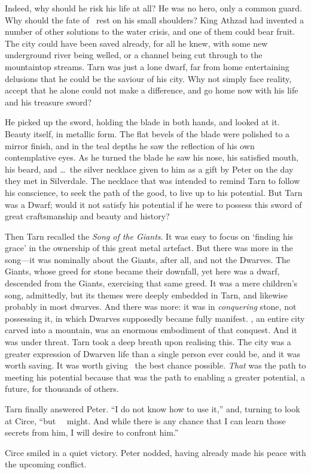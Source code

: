 Indeed, why should he risk his life at all?  He was no hero, only a common guard.  Why should the fate of \korbarthrond\ rest on his small shoulders?  King Athzad had invented a number of other solutions to the water crisis, and one of them could bear fruit.  The city could have been saved already, for all he knew, with some new underground river being welled, or a channel being cut through to the mountaintop streams.  Tarn was just a lone dwarf, far from home entertaining delusions that he could be the saviour of his city.  Why not simply face reality, accept that he alone could not make a difference, and go home now with his life and his treasure sword?

He picked up the sword, holding the blade in both hands, and looked at it.  Beauty itself, in metallic form.  The flat bevels of the blade were polished to a mirror finish, and in the teal depths he saw the reflection of his own contemplative eyes.  As he turned the blade he saw his nose, his satisfied mouth, his beard, and \ldots\ the silver necklace given to him as a gift by Peter on the day they met in Silverdale.  The necklace that was intended to remind Tarn to follow his conscience, to seek the path of the good, to live up to his potential.  But Tarn was a Dwarf; would it not satisfy his potential  if he were to possess this sword of great craftsmanship and beauty and history?

Then Tarn recalled the \emph{Song of the Giants}.  It was easy to focus on `finding his grace' in the ownership of this great metal artefact.  But there was more in the song---it was nominally about the Giants, after all, and not the Dwarves.  The Giants, whose greed for stone became their downfall, yet here was a dwarf, descended from the Giants, exercising that same greed.  It was a mere children's song, admittedly, but its themes were deeply embedded in Tarn, and likewise probably in most dwarves.  And there was more: it was in \emph{conquering} stone, not possessing it, in which Dwarves supposedly became fully manifest.  \korbarthrond, an entire city carved into a mountain, was an enormous embodiment of that conquest.  And it was under threat.  Tarn took a deep breath upon realising this.  The city was a greater expression of Dwarven life than a single person ever could be, and it was worth saving.  It was worth giving \korbarthrond\ the best chance possible.  \emph{That} was the path to meeting his potential because that was the path to enabling a greater potential, a future, for thousands of others.

Tarn finally answered Peter.  ``I do not know how to use it,''  and, turning to look at Circe, ``but \mothzam\ \driktur\ might.  And while there is any chance that I can learn those secrets from him, I will desire to confront him.''

Circe smiled in a quiet victory.  Peter nodded, having already made his peace with the upcoming conflict.  





